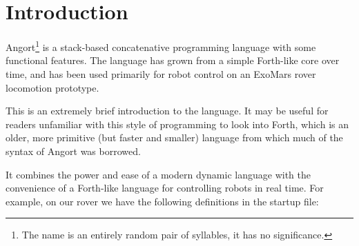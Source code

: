 \section{Introduction}
Angort\footnote{The name is an entirely random pair of syllables,
it has no significance.}
is a stack-based concatenative programming language with some
functional features. The language has grown from a simple Forth-like
core over time, and has been used primarily for robot control on
an ExoMars rover locomotion prototype.

This is an extremely brief introduction to the language. It may
be useful for readers unfamiliar with this style of programming
to look into Forth, which is an older, more primitive (but faster and
smaller) language from which much of the syntax of Angort was
borrowed.

It combines the power and ease of a modern dynamic language with
the convenience of a Forth-like language for controlling robots in
real time. For example, on our rover we have the following definitions
in the startup file:

